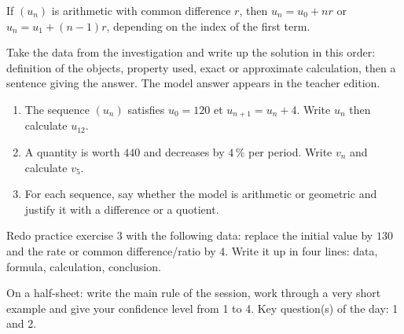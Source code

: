 \begin{traceecrite}If $(u_n)$ is arithmetic with common difference $r$, then $u_n=u_0+nr$ or $u_n=u_1+(n-1)r$, depending on the index of the first term.\end{traceecrite}

\begin{exemple}
Take the data from the investigation and write up the solution in this order: definition of the objects, property used, exact or approximate calculation, then a sentence giving the answer. The model answer appears in the teacher edition.
\end{exemple}

\begin{exercice}[-- essential]
\begin{enumerate}\item The sequence $(u_n)$ satisfies $u_0=120$ et $u_{n+1}=u_n+4$. Write $u_n$ then calculate $u_{12}$.\item A quantity is worth $440$ and decreases by $4\,\%$ per period. Write $v_n$ and calculate $v_5$.\item For each sequence, say whether the model is arithmetic or geometric and justify it with a difference or a quotient.\end{enumerate}
\end{exercice}


\begin{dm}Redo practice exercise 3 with the following data: replace the initial value by $130$ and the rate or common difference/ratio by $4$. Write it up in four lines: data, formula, calculation, conclusion.\end{dm}

\begin{sortie}On a half-sheet: write the main rule of the session, work through a very short example and give your confidence level from 1 to 4. Key question(s) of the day: 1 and 2.\end{sortie}

